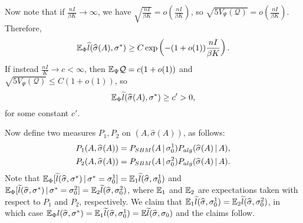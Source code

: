 \documentclass{article}
\begin{document}
Now note that if $\frac{nI}{\beta K} \rightarrow \infty$, we have $\sqrt{\frac{nI}{\beta K}} = o \left( \frac{nI}{\beta K} \right)$, so $\sqrt{ 5 V_{\Psi}(\mathcal{Q})} = o \left( \frac{nI}{\beta K} \right)$. Therefore,
\begin{equation*}
{\mathbb E}_{\Phi} \widetilde{l}(\widehat{\sigma}(A), \sigma^*) \geq C\exp \left( - (1 + o(1)) \frac{nI}{\beta K} \right).
\end{equation*}
If instead $\frac{nI}{K} \rightarrow c < \infty$, then ${\mathbb E}_{\Psi} \mathcal{Q} = c (1 + o(1))$ and $\sqrt{ 5 V_{\Psi}(\mathcal{Q})} \leq C ( 1 + o(1))$, so
\begin{equation*}
{\mathbb E}_{\Phi} \widetilde{l}(\widehat{\sigma}(A), \sigma^*) \ge c' > 0,
\end{equation*}
for some constant $c'$.

Now define two measures $P_1, P_2$ on $(A, \hat{\sigma}(A))$, as follows:
\begin{align*}
P_1(A, \widehat{\sigma}(A)) &= 
    P_{SBM}( A {\,|\,} \sigma_0^1) P_{alg}( \widehat{\sigma}(A) {\,|\,} A), \\
P_2(A, \widehat{\sigma}(A)) &= P_{SBM}( A {\,|\,} \sigma_0^2) P_{alg}( \widehat{\sigma}(A) {\,|\,} A).
\end{align*}
Note that ${\mathbb E}_{\Phi}[ \widetilde{l}(\widehat{\sigma}, \sigma^*) {\,|\,} \sigma^* = \sigma_0^1] = {\mathbb E}_1 \widetilde{l}(\widehat{\sigma}, \sigma_0^1) $ and ${\mathbb E}_{\Phi}[ \widetilde{l}(\widehat{\sigma}, \sigma^*) {\,|\,} \sigma^* = \sigma_0^2] = {\mathbb E}_2 \widetilde{l}(\widehat{\sigma}, \sigma_0^2)$, where ${\mathbb E}_1$ and ${\mathbb E}_2$ are expectations taken with respect to $P_1$ and $P_2$, respectively. We claim that ${\mathbb E}_1 \widetilde{l}(\widehat{\sigma}, \sigma_0^1) = {\mathbb E}_2 \widetilde{l}(\widehat{\sigma}, \sigma_0^2)$, in which case ${\mathbb E}_{\Phi} l(\widehat{\sigma}, \sigma^*) = {\mathbb E}_1 \widetilde{l}(\widehat{\sigma}, \sigma^1_0) = {\mathbb E} \widetilde{l}(\widehat{\sigma}, \sigma_0)$ and the claims follow.
\end{document}
